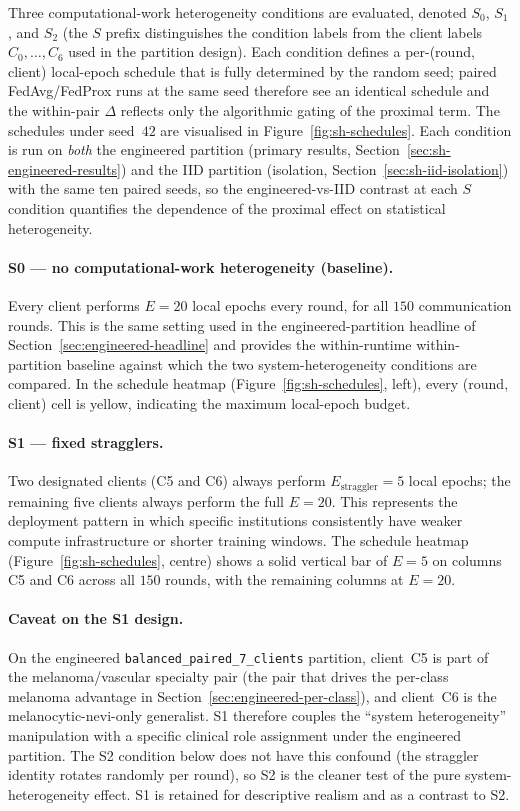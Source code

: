 \documentclass[11pt,a4paper]{report}
\begin{document}
Three computational-work heterogeneity conditions are evaluated,
denoted $S_0$, $S_1$, and $S_2$ (the $S$ prefix distinguishes the
condition labels from the client labels $C_0,\dots,C_6$ used in
the partition design). Each condition defines a per-(round,
client) local-epoch schedule that is fully determined by the
random seed; paired FedAvg/FedProx runs at the same seed therefore
see an identical schedule and the within-pair $\Delta$ reflects
only the algorithmic gating of the proximal term. The schedules
under seed~$42$ are visualised in Figure~\ref{fig:sh-schedules}.
Each condition is run on \emph{both} the engineered partition
(primary results, Section~\ref{sec:sh-engineered-results}) and
the IID partition (isolation,
Section~\ref{sec:sh-iid-isolation}) with the same ten paired
seeds, so the engineered-vs-IID contrast at each $S$ condition
quantifies the dependence of the proximal effect on
statistical heterogeneity.

\paragraph{S0 --- no computational-work heterogeneity (baseline).}
Every client performs $E = 20$ local epochs every round, for
all $150$ communication rounds. This is the same setting used
in the engineered-partition headline of
Section~\ref{sec:engineered-headline} and provides the
within-runtime within-partition baseline against which the
two system-heterogeneity conditions are compared. In the
schedule heatmap (Figure~\ref{fig:sh-schedules}, left), every
(round, client) cell is yellow, indicating the maximum
local-epoch budget.

\paragraph{S1 --- fixed stragglers.}
Two designated clients (C5 and C6) always perform
$E_{\text{straggler}} = 5$ local epochs; the remaining five
clients always perform the full $E = 20$. This represents the
deployment pattern in which specific institutions consistently
have weaker compute infrastructure or shorter training windows.
The schedule heatmap (Figure~\ref{fig:sh-schedules}, centre)
shows a solid vertical bar of $E = 5$ on columns C5 and C6
across all $150$ rounds, with the remaining columns at
$E = 20$.

\paragraph{Caveat on the S1 design.} On the engineered
\texttt{balanced\_paired\_7\_clients} partition, client~C5 is
part of the melanoma/vascular specialty pair (the pair that
drives the per-class melanoma advantage in
Section~\ref{sec:engineered-per-class}), and client~C6 is the
melanocytic-nevi-only generalist. S1 therefore couples the
``system heterogeneity'' manipulation with a specific clinical
role assignment under the engineered partition. The S2
condition below does not have this confound (the straggler
identity rotates randomly per round), so S2 is the cleaner
test of the pure system-heterogeneity effect. S1 is retained
for descriptive realism and as a contrast to S2.
\end{document}
